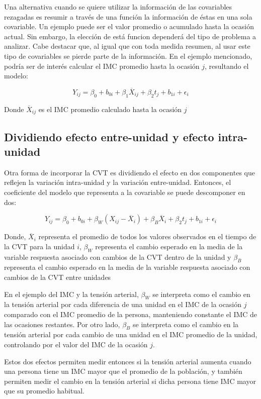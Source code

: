 \documentclass[spanish]{article}
\numberwithin{figure}{subsection}
\numberwithin{equation}{subsection}
\numberwithin{table}{subsection}
\begin{document}
Una alternativa cuando se quiere utilizar la información de las covariables
rezagadas es resumir a través de una función la información de éstas en una sola
covariable. Un ejemplo puede ser el valor promedio o acumulado hasta la ocasión
actual. Sin embargo, la elección de está funcion dependerá del tipo de problema
a analizar. Cabe destacar que, al igual que con toda medida resumen, al usar
este tipo de covariables se pierde parte de la información. En el ejemplo
mencionado, podría ser de interés calcular el IMC promedio hasta la ocasión $j$,
resultando el modelo:

\[ Y_{ij} = \beta_0 + b_{0i} + \beta_1 \overline{X}_{ij} + \beta_2 t_j + b_{1i} + \epsilon_{i} \]

Donde $\overline{X}_{ij}$ es el IMC promedio calculado hasta la ocasión $j$

\subsection{Dividiendo efecto entre-unidad y efecto intra-unidad}
\label{Dividiendo efecto entre-unidad y efecto intra-unidad}

Otra forma de incorporar la CVT es dividiendo el efecto en dos componentes que
reflejen la variación intra-unidad y la variación entre-unidad. Entonces, el
coeficiente del modelo que representa a la covariable se puede descomponer en
dos:

\[ 
	Y_{ij} = \beta_0 + b_{0i} + \beta_W (X_{ij} - \overline{X}_i) + \beta_B
	\overline{X}_i + \beta_2 t_j + b_{1i} + \epsilon_{i}
\]

Donde, $\overline{X}_i$ representa el promedio de todos los valores observados
en el tiempo de la CVT para la unidad $i$, $\beta_W$ representa el cambio
esperado en la media de la variable respuesta asociado con cambios de la CVT
dentro de la unidad y $\beta_B$ representa el cambio esperado en la media de
la variable respuesta asociado con cambios de la CVT entre unidades

En el ejemplo del IMC y la tensión arterial, $\beta_W$ se interpreta como el
cambio en la tensión arterial por cada diferencia de una unidad en el IMC de la
ocasión $j$ comparado con el IMC promedio de la persona, manteniendo constante
el IMC de las ocasiones restantes. Por otro lado, $\beta_B$ se interpreta como
el cambio en la tensión arterial por cada cambio de una unidad en el IMC
promedio de la unidad, controlando por el valor del IMC de la ocasión $j$.

Estos dos efectos permiten medir entonces si la tensión arterial aumenta cuando
una persona tiene un IMC mayor que el promedio de la población, y también
permiten medir el cambio en la tensión arterial si dicha persona tiene IMC mayor
que su promedio habitual.
\end{document}

